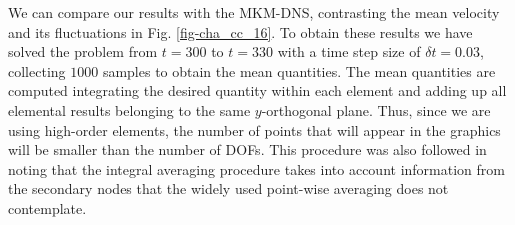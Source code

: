 We can compare our results with the MKM-DNS, contrasting the mean velocity and its fluctuations in Fig. \ref{fig-cha_cc_16}. To obtain these results we have solved the problem from $t=300$ to $t=330$ with a time step size of $\delta t=0.03$, collecting $1000$ samples to obtain the mean quantities. The mean quantities are computed integrating the desired quantity within each element and adding up all elemental results belonging to the same $y$-orthogonal plane. Thus, since we are using high-order elements, the number of points that will appear in the graphics will be smaller than the number of DOFs. This procedure was also followed in \cite{gamnitzer_time-dependent_2010} noting that the integral averaging procedure takes into account information from the secondary nodes that the widely used point-wise averaging does not contemplate.

